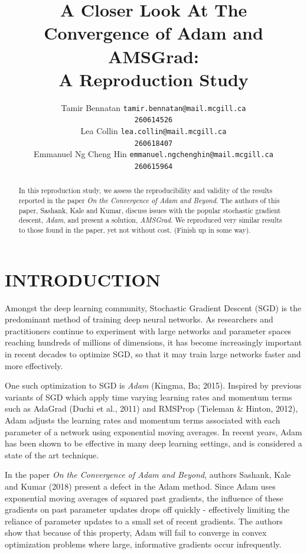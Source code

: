 \documentclass[letterpaper, 10 pt, conference]{ieeeconf}  %
\title{\LARGE \bf
A Closer Look At The Convergence of Adam and AMSGrad:\\A Reproduction Study
}
\author{ 
	\parbox{2 in}{\centering Tamir Bennatan
         {\tt\small tamir.bennatan@mail.mcgill.ca\\}
         {\tt\small 260614526}}
         \hspace*{ 0.3 in}
         \parbox{2 in}{\centering Lea Collin
         {\tt\small lea.collin@mail.mcgill.ca\\}
         {\tt\small 260618407}}
         \hspace*{0.3 in}
         \parbox{2 in}{\centering Emmanuel Ng Cheng Hin
         {\tt\small emmanuel.ngchenghin@mail.mcgill.ca\\}
         {\tt\small 260615964}}
}
\begin{document}
\maketitle
\thispagestyle{empty}
\pagestyle{empty}

\begin{abstract}
In this reproduction study, we assess the reproducibility and validity of the results reported in the paper \emph{On the Convergence of Adam and Beyond}. The authors of this paper, Sashank, Kale and Kumar, discuss issues with the popular stochastic gradient descent, \emph{Adam}, and present a solution, \emph{AMSGrad}. We reproduced very similar results to those found in the paper, yet not without cost. (Finish up in some way). 
\end{abstract}

\section{INTRODUCTION}

Amongst the deep learning community, Stochastic Gradient Descent (SGD) is the predominant method of training deep neural networks. As researchers and practitioners continue to experiment with large networks and parameter spaces reaching hundreds of millions of dimensions, it has become increasingly important in recent decades to optimize SGD, so that it may train large networks faster and more effectively. 

One such optimization to SGD is \emph{Adam} (Kingma, Ba; 2015). Inspired by previous variants of SGD which  apply time varying learning rates and momentum terms such as AdaGrad (Duchi et al.,
2011) and RMSProp (Tieleman \& Hinton, 2012), Adam adjusts the learning rates and momentum terms associated with each parameter of a network using exponential moving averages. In recent years, Adam has been shown to be effective in many deep learning settings, and is considered a state of the art technique. 

In the paper \emph{On the Convergence of Adam and Beyond}, authors Sashank, Kale and Kumar (2018) present a defect in the Adam method. Since Adam uses exponential moving averages of squared past gradients, the influence of these gradients on past parameter updates drops off quickly - effectively limiting the reliance of parameter updates to a small set of recent gradients. The authors show that because of this property, Adam will fail to converge in convex optimization problems where large, informative gradients occur infrequently. 
\end{document}
